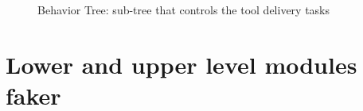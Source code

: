\begin{figure}[ht]
\begin{center}
{\begin{tikzpicture}
		    \end{tikzpicture}}
		\caption{Behavior Tree: sub-tree that controls the tool delivery tasks}
		\label{fig:DeliverToolTree}
	\end{center}
\end{figure}

\section{Lower and upper level modules faker}
\label{sec:LowerAndUpperLevelModulesFaker}

